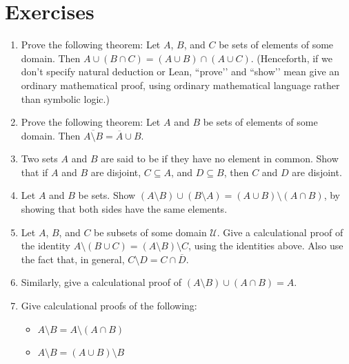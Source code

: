 \documentclass[letterpaper,10pt,english]{sphinxmanual}
\begin{document}
\section{Exercises}
\label{\detokenize{sets:exercises}}\begin{enumerate}
%
\item {} 
\sphinxAtStartPar
Prove the following theorem: Let \(A\), \(B\), and \(C\) be sets of elements of some domain. Then \(A \cup (B \cap C) = (A \cup B) \cap (A \cup C)\). (Henceforth, if we don’t specify natural deduction or Lean, ``prove’’ and ``show’’ mean give an ordinary mathematical proof, using ordinary mathematical language rather than symbolic logic.)

\item {} 
\sphinxAtStartPar
Prove the following theorem: Let \(A\) and \(B\) be sets of elements of some domain. Then \(\overline{A \setminus B} = \overline{A} \cup B\).

\item {} 
\sphinxAtStartPar
Two sets \(A\) and \(B\) are said to be  if they have no element in common. Show that if \(A\) and \(B\) are disjoint, \(C \subseteq A\), and \(D \subseteq B\), then \(C\) and \(D\) are disjoint.

\item {} 
\sphinxAtStartPar
Let \(A\) and \(B\) be sets. Show \((A \setminus B) \cup (B \setminus A) = (A \cup B) \setminus (A \cap B)\), by showing that both sides have the same elements.

\item {} 
\sphinxAtStartPar
Let \(A\), \(B\), and \(C\) be subsets of some domain \(\mathcal U\). Give a calculational proof of the identity \(A \setminus (B \cup C) = (A \setminus B) \setminus C\), using the identities above. Also use the fact that, in general, \(C \setminus D = C \cap \overline D\).

\item {} 
\sphinxAtStartPar
Similarly, give a calculational proof of \((A \setminus B) \cup (A \cap B) = A\).

\item {} 
\sphinxAtStartPar
Give calculational proofs of the following:
\begin{itemize}
\item {} 
\sphinxAtStartPar
\(A \setminus B = A \setminus (A \cap B)\)

\item {} 
\sphinxAtStartPar
\(A \setminus B = (A \cup B) \setminus B\)


\end{itemize}
\end{enumerate}
\end{document}
